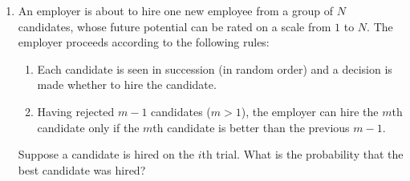 \documentclass[12pt]{article}
\theoremstyle{definition}
\theoremstyle{plain}
\newenvironment{solution}
  {\begin{proof}[Solution]}
  {\end{proof}}
\begin{document}
\begin{enumerate}
\begin{solution}
\begin{enumerate}
		Thus the probability of hitting region $ i $ is 
		\[ P(X = i) = \frac{ \frac{\pi r^2}{25} (11 - 2i) }{\pi r^2} = \frac{11 - 2i}{25}.\]
	
	\item It is easy to see that as $ i $ increases, $ P(X = i) $ decreases. Taking the derivative of the function,
		\begin{align*}
			\deriv{x} P(x) &= \frac{-2}{25} < 0.
		\end{align*}
		This holds for all $ x \in \mathbb{R} $, hence $ P(X) $ is a decreasing function.
		
	\item The function $ P(X) $ given above has domain $ S = \{ 1, 2, 3, 4, 5\} $, which is the sample space. To prove that $ P $ is indeed a probability function, we will show that it satisfies the conditions of Theorem $ 1.2.6 $, from which it follows that $ P $ is a probability function. Let $ p_i := P(X = i) $ which we will show all sum to $ 1 $. 
	\begin{align*}
		\sum_{i = 1}^5 p_i &= \sum_{i = 1}^5 \frac{11 - 2i}{25}\\
		&= \frac{\sum_{i=1}^5 11 - 2 \sum_{i=1}^5 i}{25}\\
		&= \frac{5 \cdot 11 - 2 \frac{5*6}{2} }{25}\\
		&= \frac{55 - 30}{25} \\
		&= \frac{25}{25} = 1.
	\end{align*}
	The probability function from the Theorem induced by the $ p_i $'s above coincides with $ P(X) $ since $ P( \{i\}) = \sum_{\{i \mid i \in \{i\} \} }p_i = p_i $, for all $ i \in S $.
	\end{enumerate} 
	\end{solution}
	

\setcounter{enumi}{31}
\item An employer is about to hire one new employee from a group of $ N $ candidates, whose future potential can be rated on a scale from $ 1 $ to $ N $. The employer proceeds 
according to the following rules:
	\begin{enumerate}
	\item Each candidate is seen in succession (in random order) and a decision is made whether to hire the candidate.
	\item Having rejected $ m - 1 $ candidates ($ m > 1 $), the employer can hire the $ m $th candidate only if the $ m $th candidate is better than the previous $ m - 1 $.
	\end{enumerate}
Suppose a candidate is hired on the $ i $th trial. What is the probability that the best candidate was hired?


\end{enumerate}
\end{document}
